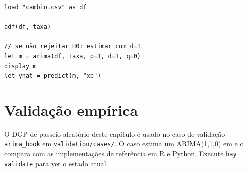 \begin{lstlisting}[caption={Fluxo típico com dados reais}]
load "cambio.csv" as df

adf(df, taxa)

// se não rejeitar H0: estimar com d=1
let m = arima(df, taxa, p=1, d=1, q=0)
display m
let yhat = predict(m, "xb")
\end{lstlisting}

\section{Validação empírica}

O DGP de passeio aleatório deste capítulo é usado no caso de validação
\texttt{arima\_book} em \texttt{validation/cases/}. O caso estima um
ARIMA(1,1,0) em \hayashi{} e o compara com as implementações de referência em
R e Python. Execute \lstinline{hay validate} para ver o estado atual.
